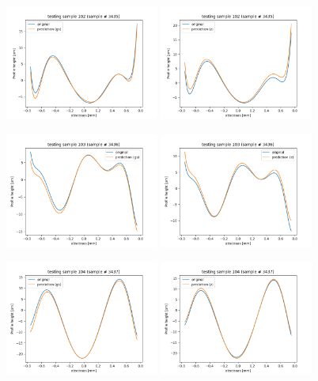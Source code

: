 \documentclass{iucr}
\begin{document}
\begin{figure}
 
    \includegraphics[width=0.45\textwidth]{figures/v13p102.png}
    \includegraphics[width=0.45\textwidth]{figures/v14p102.png}

    
    \includegraphics[width=0.45\textwidth]{figures/v13p103.png}
    \includegraphics[width=0.45\textwidth]{figures/v14p103.png}

    \includegraphics[width=0.45\textwidth]{figures/v13p104.png}
    \includegraphics[width=0.45\textwidth]{figures/v14p104.png}


\end{figure}
\end{document}

